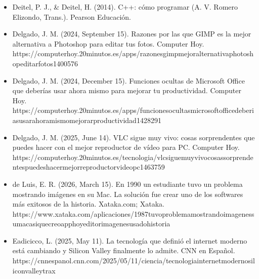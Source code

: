 \documentclass[letterpaper,10pt,spanish]{sphinxmanual}
\begin{document}
\begin{itemize}
\item {} 
\sphinxAtStartPar
Deitel, P. J., \& Deitel, H. (2014). C++: cómo programar (A. V. Romero Elizondo, Trans.). Pearson Educación.

\item {} 
\sphinxAtStartPar
Delgado, J. M. (2024, September 15). Razones por las que GIMP es la mejor alternativa a Photoshop para editar tus fotos. Computer Hoy. https://computerhoy.20minutos.es/apps/razones\sphinxhyphen{}gimp\sphinxhyphen{}mejor\sphinxhyphen{}alternativa\sphinxhyphen{}photoshop\sphinxhyphen{}editar\sphinxhyphen{}fotos\sphinxhyphen{}1400576

\item {} 
\sphinxAtStartPar
Delgado, J. M. (2024, December 15). Funciones ocultas de Microsoft Office que deberías usar ahora mismo para mejorar tu productividad. Computer Hoy. https://computerhoy.20minutos.es/apps/funciones\sphinxhyphen{}ocultas\sphinxhyphen{}microsoft\sphinxhyphen{}office\sphinxhyphen{}deberias\sphinxhyphen{}usar\sphinxhyphen{}ahora\sphinxhyphen{}mismo\sphinxhyphen{}mejorar\sphinxhyphen{}productividad\sphinxhyphen{}1428291

\item {} 
\sphinxAtStartPar
Delgado, J. M. (2025, June 14). VLC sigue muy vivo: cosas sorprendentes que puedes hacer con el mejor reproductor de vídeo para PC. Computer Hoy. https://computerhoy.20minutos.es/tecnologia/vlc\sphinxhyphen{}sigue\sphinxhyphen{}muy\sphinxhyphen{}vivo\sphinxhyphen{}cosas\sphinxhyphen{}sorprendentes\sphinxhyphen{}puedes\sphinxhyphen{}hacer\sphinxhyphen{}mejor\sphinxhyphen{}reproductor\sphinxhyphen{}video\sphinxhyphen{}pc\sphinxhyphen{}1463759

\item {} 
\sphinxAtStartPar
de Luis, E. R. (2026, March 15). En 1990 un estudiante tuvo un problema mostrando imágenes en su Mac. La solución fue crear uno de los softwares más exitosos de la historia. Xataka.com; Xataka. https://www.xataka.com/aplicaciones/1987\sphinxhyphen{}tuvo\sphinxhyphen{}problema\sphinxhyphen{}mostrando\sphinxhyphen{}imagenes\sphinxhyphen{}su\sphinxhyphen{}mac\sphinxhyphen{}asi\sphinxhyphen{}que\sphinxhyphen{}creo\sphinxhyphen{}app\sphinxhyphen{}hoy\sphinxhyphen{}editor\sphinxhyphen{}imagenes\sphinxhyphen{}usado\sphinxhyphen{}historia

\item {} 
\sphinxAtStartPar
Eadicicco, L. (2025, May 11). La tecnologí­a que definió el internet moderno está cambiando y Silicon Valley finalmente lo admite. CNN en Español. https://cnnespanol.cnn.com/2025/05/11/ciencia/tecnologia\sphinxhyphen{}internet\sphinxhyphen{}moderno\sphinxhyphen{}silicon\sphinxhyphen{}valley\sphinxhyphen{}trax


\end{itemize}
\end{document}
